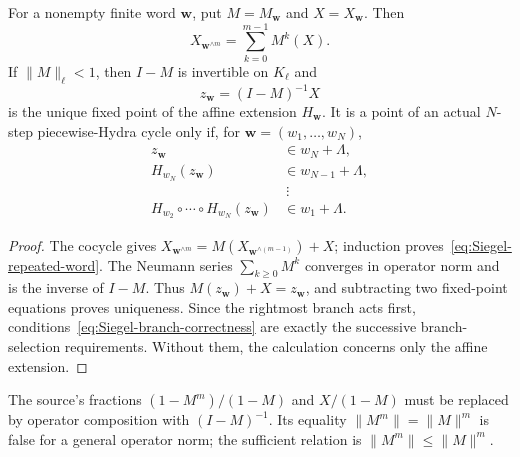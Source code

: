 \begin{proposition}
\label{prop:Siegel-periodic-word-fixed-point}
For a nonempty finite word $\mathbf w$, put
$M=M_{\mathbf w}$ and $X=X_{\mathbf w}$.  Then
\begin{equation}
\label{eq:Siegel-repeated-word}
 X_{\mathbf w^{\wedge m}}
 =\sum_{k=0}^{m-1}M^k(X).
\end{equation}
If $\lVert M\rVert_\ell<1$, then $I-M$ is invertible on $K_\ell$ and
\[
 z_{\mathbf w}=(I-M)^{-1}X
\]
is the unique fixed point of the affine extension $H_{\mathbf w}$.
It is a point of an actual $N$-step piecewise-Hydra cycle only if, for
$\mathbf w=(w_1,\ldots,w_N)$,
\begin{equation}
\label{eq:Siegel-branch-correctness}
\begin{split}
 z_{\mathbf w}&\in w_N+\Lambda,\\
 H_{w_N}(z_{\mathbf w})&\in w_{N-1}+\Lambda,\\
 &\ \vdots\\
 H_{w_2}\circ\cdots\circ H_{w_N}(z_{\mathbf w})
   &\in w_1+\Lambda.
\end{split}
\end{equation}
\end{proposition}

\begin{proof}
The cocycle gives
$X_{\mathbf w^{\wedge m}}=M(X_{\mathbf w^{\wedge(m-1)}})+X$;
induction proves~\eqref{eq:Siegel-repeated-word}.  The Neumann series
$\sum_{k\geq0}M^k$ converges in operator norm and is the inverse of $I-M$.
Thus $M(z_{\mathbf w})+X=z_{\mathbf w}$, and subtracting two fixed-point
equations proves uniqueness.  Since the rightmost branch acts first,
conditions~\eqref{eq:Siegel-branch-correctness} are exactly the successive
branch-selection requirements.  Without them, the calculation concerns only
the affine extension.
\end{proof}

The source's fractions $(1-M^m)/(1-M)$ and $X/(1-M)$ must be replaced by
operator composition with $(I-M)^{-1}$.  Its equality
$\lVert M^m\rVert=\lVert M\rVert^m$ is false for a general operator norm;
the sufficient relation is
$\lVert M^m\rVert\leq\lVert M\rVert^m$.

